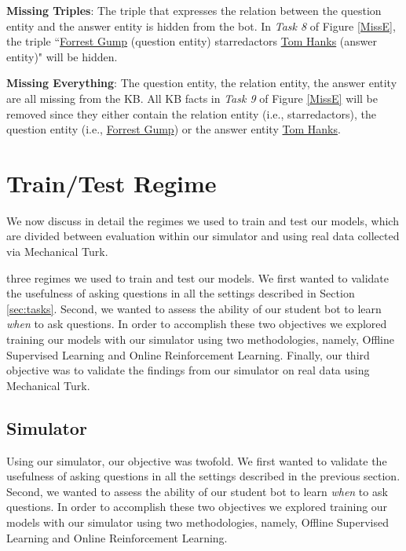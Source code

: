 {\bf Missing Triples}:
The triple that expresses the relation between the question entity and the answer entity is hidden from the bot. In {\it Task 8} of Figure \ref{MissE}, the triple ``\underline{Forrest Gump} (question entity)
starred\textunderscore actors  \underline{Tom Hanks} (answer entity)" will be hidden.

{\bf Missing Everything}: The question entity, the relation entity, the answer entity are
all missing from the KB. All KB facts in
{\it Task 9} of Figure \ref{MissE} will be removed since they either contain the relation entity (i.e., starred\textunderscore actors), the question entity (i.e., \underline{Forrest Gump}) or the answer entity \underline{Tom Hanks}.

\section{Train/Test Regime}
\label{Train_Test}
We now discuss in detail the regimes we used to train and test our models,
which are divided between evaluation within our simulator and using
real  data collected via Mechanical Turk.

three regimes we used to train and
test our models. We first wanted to validate the usefulness of asking questions 
in all the settings described in Section \ref{sec:tasks}.
Second, we wanted to assess the ability of our student bot 
to learn {\em when} to ask questions.
In order to accomplish these two
objectives we explored training our models with our simulator using two methodologies,
namely, Offline Supervised Learning and Online Reinforcement Learning.
Finally, our third objective was to validate the findings from our simulator
on real data using Mechanical Turk.
\fi 

\subsection{Simulator}

\label{sec:train-test}

Using our simulator, our objective was twofold.
We first wanted to validate the usefulness of asking questions 
in all the settings described in the previous section.
Second, we wanted to assess the ability of our student bot 
to learn {\em when} to ask questions.
In order to accomplish these two
objectives we explored training our models with our simulator using two methodologies,
namely, Offline Supervised Learning and Online Reinforcement Learning.


